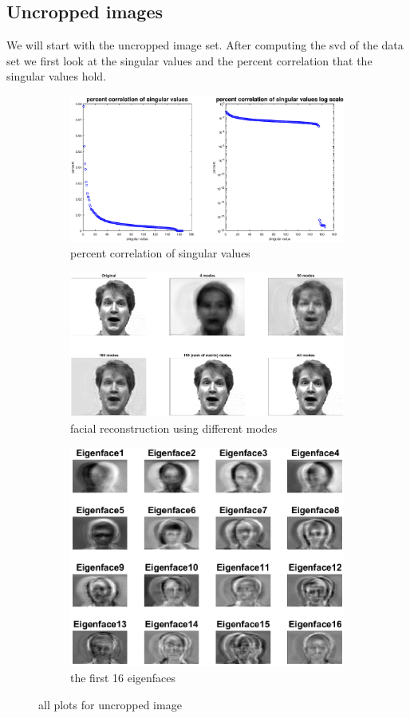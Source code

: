 \documentclass[]{article}
\begin{document}
\subsection{Uncropped images}
We will start with the uncropped image set. After computing the svd of the data set we first look at the singular values and the percent correlation that the singular values hold. 
\begin{figure}[!htbp]
	\begin{subfigure}{\linewidth}
		\includegraphics [width=4in]{ucPercent.eps}
		\caption{percent correlation of singular values}
	\end{subfigure}	
	\begin{subfigure}{\linewidth}
		\includegraphics [width=4in]{ucReconstruction.eps}
		\caption{facial reconstruction using different modes}
	\end{subfigure}
	\begin{subfigure}{\linewidth}
		\includegraphics [width=4in]{ucEigenface.eps}
		\caption{the first 16 eigenfaces}
	\end{subfigure}
	\caption{all plots for uncropped image}
\end{figure}
\end{document}
